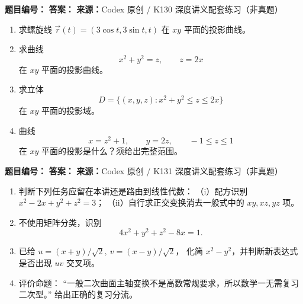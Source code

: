 \begin{problemBox}
\begin{problemMeta}
\textbf{题目编号：} \quad
\textbf{答案：} \quad
\textbf{来源：}Codex 原创 / K130 深度讲义配套练习（非真题）
\end{problemMeta}
\begin{enumerate}
  \item[\textbf{A}] 求螺旋线
  \(\vec r(t)=(3\cos t,3\sin t,t)\) 在 \(xy\) 平面的投影曲线。
  \item[\textbf{B}] 求曲线
  \[
  x^2+y^2=z,\qquad z=2x
  \]
  在 \(xy\) 平面的投影曲线。
  \item[\textbf{C}] 求立体
  \[
  D=\{(x,y,z):x^2+y^2\le z\le2x\}
  \]
  在 \(xy\) 平面的投影域。
  \item[\textbf{M}] 曲线
  \[
  x=z^2+1,\qquad y=2z,\qquad -1\le z\le1
  \]
  在 \(xy\) 平面的投影是什么？须给出完整范围。
\end{enumerate}
\end{problemBox}

\begin{problemBox}
\begin{problemMeta}
\textbf{题目编号：} \quad
\textbf{答案：} \quad
\textbf{来源：}Codex 原创 / K131 深度讲义配套练习（非真题）
\end{problemMeta}
\begin{enumerate}
  \item[\textbf{A}] 判断下列任务应留在本讲还是路由到线性代数：
  （i）配方识别 \(x^2-2x+y^2+z^2=3\)；
  （ii）自行求正交变换消去一般式中的 \(xy,xz,yz\) 项。
  \item[\textbf{B}] 不使用矩阵分类，识别
  \[
  4x^2+y^2+z^2-8x=1.
  \]
  \item[\textbf{C}] 已给
  \(u=(x+y)/\sqrt2,\ v=(x-y)/\sqrt2\)，
  化简 \(x^2-y^2\)，并判断新表达式是否出现 \(uv\) 交叉项。
  \item[\textbf{M}] 评价命题：
  “一般二次曲面主轴变换不是高数常规要求，所以数学一无需复习二次型。”
  给出正确的复习分流。
\end{enumerate}
\end{problemBox}
